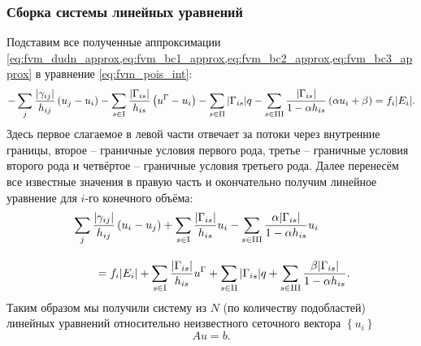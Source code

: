 \subsubsection{Сборка системы линейных уравнений}
Подставим все полученные аппроксимации
\cref{eq:fvm_dudn_approx,eq:fvm_bc1_approx,eq:fvm_bc2_approx,eq:fvm_bc3_approx}
в уравнение \cref{eq:fvm_pois_int}:
\begin{equation*}
-\sum_j
    \frac{|\gamma_{ij}|}{h_{ij}}
         \left(u_j - u_i\right)
-\sum_{s\in{\rm I}}
    \frac{|\Gamma_{is}|}{h_{is}}
        \left(u^\Gamma - u_i\right)
-\sum_{s\in{\rm II}}
    |\Gamma_{is}| q
-\sum_{s\in{\rm III}}
    \frac{|\Gamma_{is}|}{1 - \alpha h_{is}}
    \left(\alpha u_i + \beta\right)
=
f_i |E_i|.
\end{equation*}
Здесь первое слагаемое в левой части отвечает за потоки через внутренние границы,
второе -- граничные условия первого рода, третье -- граничные условия второго рода
и четвёртое -- граничные условия третьего рода.
Далее перенесём все известные значения в правую часть и окончательно
получим линейное уравнение для $i$-го конечного объёма:
\begin{equation}
\label{eq:fvm_slae}
\begin{split}
&\sum_j
    \frac{|\gamma_{ij}|}{h_{ij}}
         \left(u_i - u_j\right)
+\sum_{s\in{\rm I}}
    \frac{|\Gamma_{is}|}{h_{is}}u_i
-\sum_{s\in{\rm III}}
    \frac{\alpha |\Gamma_{is}|}{1 - \alpha h_{is}}
    u_i 
\\[10pt]
&\qquad =
f_i |E_i|
+\sum_{s\in{\rm I}}
    \frac{|\Gamma_{is}|}{h_{is}} u^\Gamma
+\sum_{s\in{\rm II}}
    |\Gamma_{is}| q
+\sum_{s\in{\rm III}}
    \frac{\beta |\Gamma_{is}|}{1 - \alpha h_{is}}.
\end{split}
\end{equation}
Таким образом мы получили систему из $N$ (по количеству подобластей) линейных уравнений относительно
неизвестного сеточного вектора $\left\{u_i\right\}$
$$
A u = b.
$$

